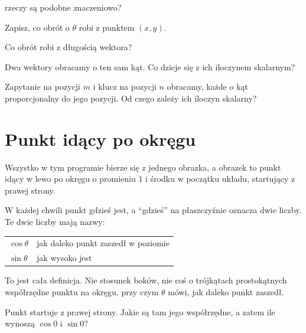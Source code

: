 \begin{quiz}
  rzeczy są podobne znaczeniowo? 
\item Zapisz, co obrót o $\theta$ robi z punktem $(x, y)$.
\item Co obrót robi z długością wektora? 
\item Dwa wektory obracamy o ten sam kąt. Co dzieje się z ich iloczynem
  skalarnym? 
\item Zapytanie na pozycji $m$ i klucz na pozycji $n$ obracamy, każde o kąt
  proporcjonalny do jego pozycji. Od czego zależy ich iloczyn skalarny?
\end{quiz}

\section{Punkt idący po okręgu}
\label{sec:F08-circle}

\begin{fr}
Wszystko w tym programie bierze się z jednego obrazka, a obrazek to punkt
idący w lewo po okręgu o promieniu $1$ i środku w początku układu, startujący
z prawej strony.

W każdej chwili punkt gdzieś jest, a \enquote{gdzieś} na płaszczyźnie oznacza
dwie liczby. Te dwie liczby mają nazwy:

\begin{center}
\begin{tabular}{ll}
\toprule
$\cos\theta$ & jak daleko punkt zaszedł w poziomie \\
$\sin\theta$ & jak wysoko jest \\
\bottomrule
\end{tabular}
\end{center}

To jest cała definicja. Nie stosunek boków, nie coś o trójkątach
prostokątnych \dash{} współrzędne punktu na okręgu, przy czym $\theta$ mówi,
jak daleko punkt zaszedł.

Punkt startuje z prawej strony. Jakie są tam jego współrzędne, a zatem ile
wynoszą $\cos 0$ i $\sin 0$?
\nextframe
\end{fr}

